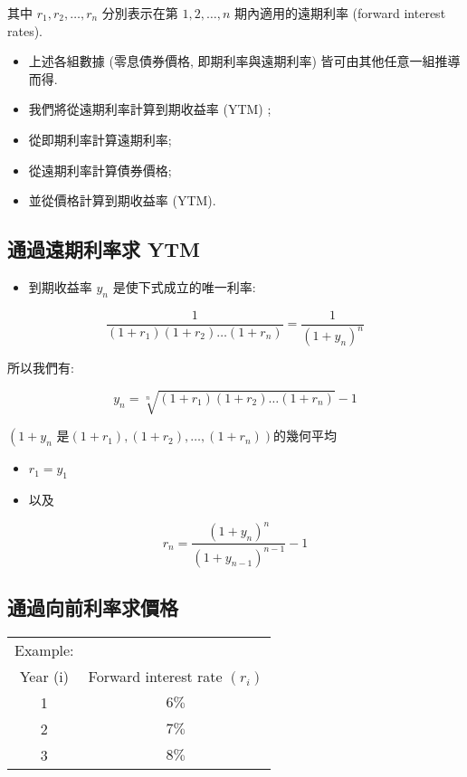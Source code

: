 \documentclass[letterpaper]{article}
\begin{document}
		其中 \( r_{1}, r_{2}, \ldots, r_{n} \) 分別表示在第 \(1, 2, \ldots, n\) 期內適用的遠期利率 (forward interest rates).  
		
		\begin{itemize}
			\item 上述各組數據 (零息債券價格, 即期利率與遠期利率) 皆可由其他任意一組推導而得.  
			\item 我們將從遠期利率計算到期收益率 (YTM) ; 
			\item 從即期利率計算遠期利率; 
			\item 從遠期利率計算債券價格; 
			\item 並從價格計算到期收益率 (YTM).  
		\end{itemize}
		
		
		\subsection{通過遠期利率求 YTM }
		\begin{itemize}
			\item 到期收益率 \( y_{n} \) 是使下式成立的唯一利率: 
		\end{itemize}
		$$
		\frac{1}{\left (1+r_{1}\right) \left (1+r_{2}\right) \ldots\left (1+r_{n}\right) }=\frac{1}{\left (1+y_{n}\right) ^{n}}
		$$
		
		所以我們有: 
		
		$$
		y_{n}=\sqrt[n]{\left (1+r_{1}\right) \left (1+r_{2}\right) \ldots\left (1+r_{n}\right) }-1
		$$
		
		$\left (1+y_{n}\right.$ 是$\left.\left (1+r_{1}\right), \left (1+r_{2}\right), \ldots, \left (1+r_{n}\right) \right) $的幾何平均 
		
		
		\begin{itemize}
			\item $r_{1}=y_{1}$
			\item 以及
		\end{itemize}
		
		$$
		r_{n}=\frac{\left (1+y_{n}\right) ^{n}}{\left (1+y_{n-1}\right) ^{n-1}}-1
		$$
		
		\subsection{通過向前利率求價格}
		
		\begin{center}
			\begin{tabular}{cc}
				Example:  &  \\
				Year (i) & Forward interest rate $\left (r_{i}\right) $ \\
				\hline
				1 & $6 \%$ \\
				2 & $7 \%$ \\
				3 & $8 \%$ \\
			\end{tabular}
		\end{center}
		
\end{document}
